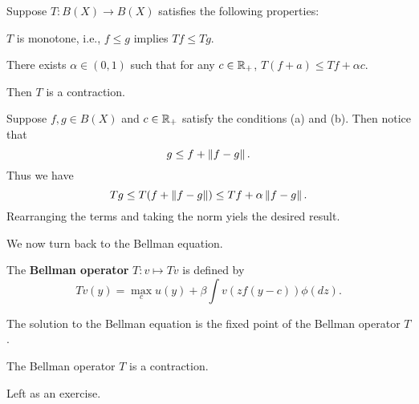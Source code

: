 \documentclass[12pt]{article}
\begin{document}
\begin{theorem}
    Suppose $T: B(X) \to B(X)$ satisfies the following properties: 
    \begin{thmenum}
        \item $T$ is monotone, i.e., $f \leq g$ implies $Tf \leq Tg$.
        \item There exists $\alpha\in (0,1)$ such that for any 
        $c\in \mathbb{R}_+$, $T(f+a) \leq Tf + \alpha c$.
    \end{thmenum}
    Then $T$ is a contraction.
\end{theorem}
\begin{pf}
    Suppose $f, g \in B(X)$ and $c\in\mathbb{R}_+$ satisfy the conditions 
    (a) and (b). Then notice that
    \begin{equation}
        g \leq f + \left\lVert {f-g} \right\rVert.
    \end{equation}
    Thus we have 
    \begin{equation}
        Tg \leq T(f + \left\lVert {f-g} \right\rVert) \leq Tf + \alpha\left\lVert {f-g} \right\rVert.
    \end{equation}
    Rearranging the terms and taking the norm yiels the 
    desired result.
\end{pf}

We now turn back to the Bellman equation. 

\begin{definition}
    The \textbf{Bellman operator} $T: v \mapsto Tv$ is defined by 
    \begin{equation}
        Tv(y) = \max_{c} u(y) + \beta\int v(zf(y-c))\phi(dz).
    \end{equation}
\end{definition}
\begin{remark}
    The solution to the Bellman equation is the fixed point of the 
    Bellman operator $T$.
\end{remark}

\begin{corollary}
    The Bellman operator $T$ is a contraction.
\end{corollary}
\begin{pf}
    Left as an exercise.
\end{pf}
\end{document}
